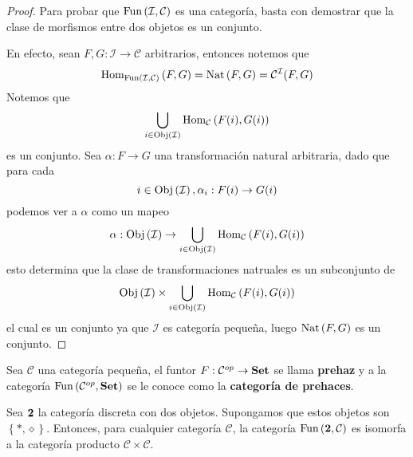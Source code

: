 \documentclass[12pt]{report}
\theoremstyle{largebreak}
\newcommand\cf[3]{\ensuremath{#1:#2\rightarrow#3}}
\newcommand{\Obj}[1]{\ensuremath{\textup{Obj}\left(#1\right)}}
\newcommand{\Hom}[3]{\ensuremath{\textup{Hom}_{#1}\left(#2,#3\right)}}
\newcommand{\Cat}[1]{\ensuremath{\textup{\textbf{#1}}}}
\newcommand{\Fun}[2]{\ensuremath{\textup{Fun}\left(#1,#2\right)}}
\begin{document}
    \begin{proof}
        Para probar que $\Fun{\mathcal{I}}{\mathcal{C}}$ es una categoría, basta con demostrar que la clase de morfismos entre dos objetos es un conjunto.

        En efecto, sean $\cf{F,G}{\mathcal{I}}{\mathcal{C}}$ arbitrarios, entonces notemos que
        \begin{equation*}
            \Hom{\Fun{\mathcal{I}}{\mathcal{C}}}{F}{G}=\Nat{F}{G}=\mathcal{C}^{\mathcal{I}}(F,G)
        \end{equation*}
        Notemos que
        \begin{equation*}
            \bigcup_{ i\in\Obj{\mathcal{I}}}\Hom{\mathcal{C}}{F(i)}{G(i)}
        \end{equation*}
        es un conjunto. Sea $\cf{\alpha}{F}{G}$ una transformación natural arbitraria, dado que para cada
        \begin{equation*}
            i\in\Obj{\mathcal{I}},\cf{\alpha_i}{F(i)}{G(i)}
        \end{equation*}
        podemos ver a $\alpha$ como un mapeo
        \begin{equation*}
            \cf{\alpha}{\Obj{\mathcal{I}}}{\bigcup_{ i\in\Obj{\mathcal{I}}}\Hom{\mathcal{C}}{F(i)}{G(i)} }
        \end{equation*}
        esto determina que la clase de transformaciones natruales es un subconjunto de
        \begin{equation*}
            \Obj{\mathcal{I}}\times \bigcup_{i\in\Obj{\mathcal{I}}}\Hom{\mathcal{C}}{F(i)}{G(i)}
        \end{equation*}
        el cual es un conjunto ya que $\mathcal{I}$ es categoría pequeña, luego $\textup{Nat}\left(F,G\right)$ es un conjunto.
    \end{proof}

    \begin{exa}
        Sea $\mathcal{C}$ una categoría pequeña, el funtor $\cf{F}{\mathcal{C}^{op}}{\Cat{Set}}$ se llama \textbf{prehaz} y a la categoría $\Fun{\mathcal{C}^{op}}{\Cat{Set}}$ se le conoce como la \textbf{categoría de prehaces}.
    \end{exa}

    \begin{exa}
        Sea $\Cat{2}$ la categoría discreta con dos objetos. Supongamos que estos objetos son $\left\{*,\diamond\right\}$. Entonces, para cualquier categoría $\mathcal{C}$, la categoría $\Fun{\Cat{2}}{\mathcal{C}}$ es isomorfa a la categoría producto $\mathcal{C}\times\mathcal{C}$.
    \end{exa}
\end{document}
